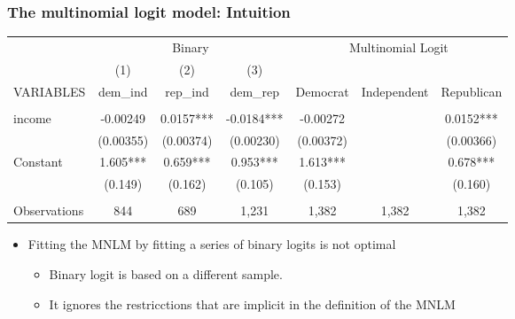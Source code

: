 \documentclass[
  shownotes,
  xcolor={svgnames},
  hyperref={colorlinks,citecolor=DarkBlue,linkcolor=DarkRed,urlcolor=DarkBlue}
  , aspectratio=169]{beamer}
\begin{document}
\begin{frame}[fragile]
\frametitle{The multinomial logit model: Intuition}




\begin{table}[H]
\scriptsize
\begin{tabular}{lcccccc} \hline
&\multicolumn{3}{c}{Binary} & \multicolumn{3}{c}{Multinomial Logit} \\
 & (1) & (2) & (3) & & & \\
VARIABLES & dem\_ind & rep\_ind & dem\_rep & Democrat & Independent & Republican \\ \hline
 &  &  &  &  &  &  \\
income & -0.00249 & 0.0157*** & -0.0184*** & -0.00272 &  & 0.0152*** \\
 & (0.00355) & (0.00374) & (0.00230) & (0.00372) &  & (0.00366) \\
Constant & 1.605*** & 0.659*** & 0.953*** & 1.613*** &  & 0.678*** \\
 & (0.149) & (0.162) & (0.105) & (0.153) &  & (0.160) \\
 &  &  &  &  &  &  \\
 Observations & 844 & 689 & 1,231 & 1,382 & 1,382 & 1,382 \\ \hline

\end{tabular}
\end{table}



\begin{itemize}
 \item Fitting the MNLM by fitting a series of binary logits is not optimal
 \medskip
   \begin{itemize}
   \item  Binary logit is based on a different sample. 
   \medskip
  \item It ignores the restricctions that are implicit in the definition of the MNLM
  \end{itemize}
\end{itemize}



\end{frame}
\end{document}

